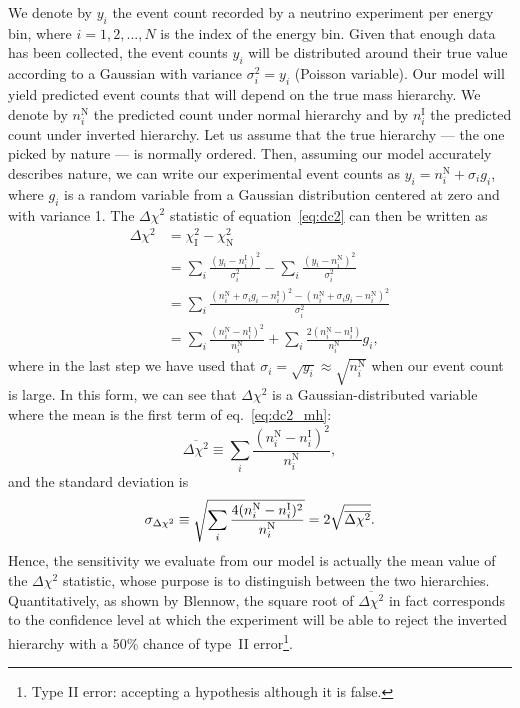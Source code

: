 We denote by $y_i$ the event count recorded by a neutrino experiment per energy
bin, where $i = 1, 2, ..., N$ is the index of the energy bin.
Given that enough data has been collected,
the event counts $y_i$ will be distributed around their true value
according to a Gaussian with variance $\sigma^2_i=y_i$ (Poisson variable). 
Our model will yield predicted event counts that will depend on
the true mass hierarchy.  We denote by $n^\text{N}_i$ the predicted count under normal
hierarchy and by $n^\text{I}_i$ the predicted count under inverted hierarchy.
Let us assume that the true hierarchy --- the one picked by nature --- is normally
ordered. Then, assuming our model accurately describes nature,  we can write
our experimental event counts as $y_i = n^\text{N}_i + \sigma_i g_i$, where
$g_i$ is a random variable from a Gaussian distribution centered at zero and
with variance 1.
The $\Delta \chi^2$ statistic of equation~\ref{eq:dc2} can then be written as
\begin{align}
	\Delta \chi^2 &= \chi_\text{I}^2 - \chi_\text{N}^2\nonumber\\
	&= \sum_i \frac{(y_i - n^\text{I}_i)^2}{\sigma_i^2} - \sum_i \frac{(y_i -
	n^\text{N}_i)^2}{\sigma_i^2}\nonumber\\
	&= \sum_i \frac{(n^\text{N}_i + \sigma_i g_i - n^\text{I}_i)^2 - (n^\text{N}_i + \sigma_i g_i -
	n^\text{N}_i)^2}{\sigma_i^2}\nonumber\\
	&= \sum_i \frac{(n^\text{N}_i - n^\text{I}_i)^2}{n^\text{N}_i} + \sum_i
	\frac{2(n^\text{N}_i -
	n^\text{I}_i)}{n^\text{N}_i} g_i,\label{eq:dc2_mh}
\end{align}
where in the last step we have used that $\sigma_i = \sqrt{y_i} \approx \sqrt{n^\text{N}_i}$
when our event count is large.
In this form, we can see that $\Delta \chi^2$ is a Gaussian-distributed
variable where the mean is the first term of eq.~\ref{eq:dc2_mh}:
\begin{equation}
	\overline{\Delta\chi^2} \equiv \sum_i \frac{(n^\text{N}_i -
n^\text{I}_i)^2}{n^\text{N}_i},\label{eq:mean_dc2_mh}\end{equation}
and the standard deviation is
$$\sigma_{\Delta\chi^2} \equiv \sqrt{\sum_i \frac{4(n^\text{N}_i -
n^\text{I}_i)^2}{n^\text{N}_i}}\\
= 2\sqrt{\overline{\Delta\chi^2}}.$$
Hence, the sensitivity we evaluate from our model is actually the mean value of
the $\Delta\chi^2$ statistic, whose purpose is to distinguish between the two
hierarchies. Quantitatively, as shown by Blennow\cite{blennow}, the square root of
$\overline{\Delta\chi^2}$ in fact corresponds to the confidence level at which the
experiment will be able to reject the inverted hierarchy with a 50\% chance of
type~II error\footnote{Type II error: accepting a hypothesis although it is
false.}. 

